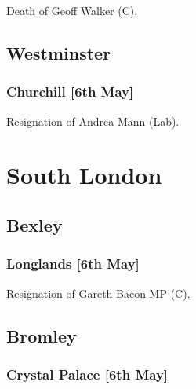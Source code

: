 \documentclass[a4paper,openany]{book}
\begin{document}
\begin{resultsiii}
Death of Geoff Walker (C).

\subsection*{Westminster}

\subsubsection*{Churchill \hspace*{\fill}\nolinebreak[1]%
	\enspace\hspace*{\fill}
	[6th May]}


Resignation of Andrea Mann (Lab).

\section{South London}

\subsection*{Bexley}

\subsubsection*{Longlands \hspace*{\fill}\nolinebreak[1]%
	\enspace\hspace*{\fill}
	[6th May]}


Resignation of Gareth Bacon MP (C).

\subsection*{Bromley}

\subsubsection*{Crystal Palace \hspace*{\fill}\nolinebreak[1]%
	\enspace\hspace*{\fill}
	[6th May]}



\end{resultsiii}
\end{document}
